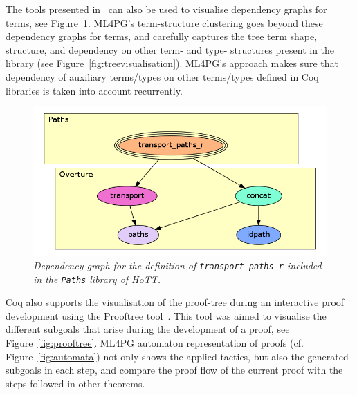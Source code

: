 The tools presented in~\cite{dpdgraph,BPP00} can also be used to visualise dependency graphs for terms, see Figure~\ref{fig:dgraph2}. 
ML4PG’s term-structure clustering goes beyond these dependency graphs for terms, and carefully captures the tree term shape, structure,
and dependency on other term- and type- structures present in the library (see Figure~\ref{fig:treevisualisation}). ML4PG's approach makes sure that dependency of auxiliary terms/types on other terms/types defined in Coq libraries is taken into account recurrently. 


\begin{figure}
\centering
\includegraphics[scale=.35]{graphpaths.png}
\caption{\scriptsize{\emph{Dependency graph for the definition of \texttt{transport\_paths\_r} included in the \texttt{Paths} library of HoTT.}}}\label{fig:dgraph2}
\end{figure}


Coq also supports the visualisation of the proof-tree during an interactive proof development using the Prooftree tool~\cite{prooftree}. This tool was aimed to visualise the different subgoals that arise during the development of a proof, see Figure~\ref{fig:prooftree}. ML4PG automaton representation of proofs (cf. Figure~\ref{fig:automata}) not only shows the applied tactics, but also the generated-subgoals in each step, and compare the proof flow of the current proof with the steps followed in other theorems. 


